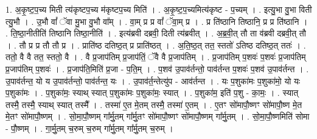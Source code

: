 \documentclass[17pt]{extarticle}
\begin{document}
1. अ॒कृ॒ष्ट॒प॒च्य मिती त्य॑कृष्टप॒च्य म॑कृष्टप॒च्य मिति॑ । . अ॒कृ॒ष्ट॒प॒च्यमित्य॑कृष्ट - प॒च्यम् । . इत्यु॒भा वु॒भा विती त्यु॒भौ । . उ॒भौ वां᳚ ॅवा मु॒भा वु॒भौ वा᳚म् । . वा॒म् प्र प्र वां᳚ ॅवा॒म् प्र । . प्र ति॑ष्ठानि तिष्ठानि॒ प्र प्र ति॑ष्ठानि । . ति॒ष्ठा॒नीतीति॑ तिष्ठानि तिष्ठा॒नीति॑ । . इत्य॑ब्रवी दब्रवी॒ दिती त्य॑ब्रवीत् । . अ॒ब्र॒वी॒त् तौ ता व॑ब्रवी दब्रवी॒त् तौ । . तौ प्र प्र तौ तौ प्र । . प्राति॑ष्ठ दतिष्ठ॒त् प्र प्राति॑ष्ठत् । . अ॒ति॒ष्ठ॒त् तत॒ स्ततो॑ ऽतिष्ठ दतिष्ठ॒त् ततः॑ । . ततो॒ वै वै तत॒ स्ततो॒ वै । . वै प्र॒जाप॑तिम् प्र॒जाप॑तिं॒ ॅवै वै प्र॒जाप॑तिम् । . प्र॒जाप॑तिम् प॒शवः॑ प॒शवः॑ प्र॒जाप॑तिम् प्र॒जाप॑तिम् प॒शवः॑ । . प्र॒जाप॑ति॒मिति॑ प्र॒जा - प॒ति॒म् । . प॒शव॑ उ॒पाव॑र्तन्तो॒ पाव॑र्तन्त प॒शवः॑ प॒शव॑ उ॒पाव॑र्तन्त । . उ॒पाव॑र्तन्त॒ यो य उ॒पाव॑र्तन्तो॒ पाव॑र्तन्त॒ यः । . उ॒पाव॑र्त॒न्तेत्यु॑प - आव॑र्तन्त । . यः प॒शुका॑मः प॒शुका॑मो॒ यो यः प॒शुका॑मः । . प॒शुका॑मः॒ स्याथ् स्यात् प॒शुका॑मः प॒शुका॑मः॒ स्यात् । . प॒शुका॑म॒ इति॑ प॒शु - का॒मः॒ । . स्यात् तस्मै॒ तस्मै॒ स्याथ् स्यात् तस्मै᳚ । . तस्मा॑ ए॒त मे॒तम् तस्मै॒ तस्मा॑ ए॒तम् । . ए॒तꣳ सो॑मापौ॒ष्णꣳ सो॑मापौ॒ष्ण मे॒त मे॒तꣳ सो॑मापौ॒ष्णम् । . सो॒मा॒पौ॒ष्णम् गा᳚र्मु॒तम् गा᳚र्मु॒तꣳ सो॑मापौ॒ष्णꣳ सो॑मापौ॒ष्णम् गा᳚र्मु॒तम् । . सो॒मा॒पौ॒ष्णमिति॑ सोमा - पौ॒ष्णम् । . गा॒र्मु॒तम् च॒रुम् च॒रुम् गा᳚र्मु॒तम् गा᳚र्मु॒तम् च॒रुम् । \newline
\end{document}
